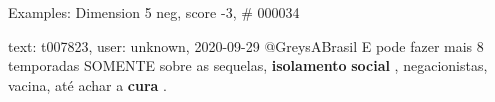 \begin{frame}{Examples: Dimension 5 neg, score -3, \# 000034}
\footnotesize
\begin{alertblock}{text: t007823, user: unknown, 2020-09-29}
@GreysABrasil E pode fazer mais 8 temporadas SOMENTE sobre as sequelas, 
\textbf{isolamento} \textbf{social} , negacionistas, vacina, até achar a 
\textbf{cura} . 
\end{alertblock}
\end{frame}
